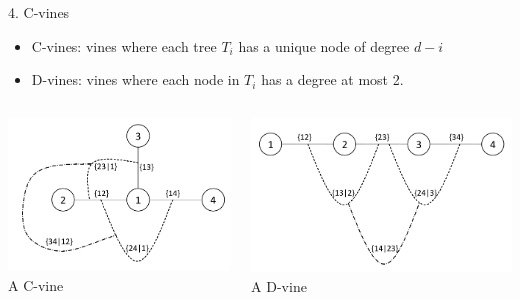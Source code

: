 \documentclass[
  ignorenonframetext,
]{beamer}
\providecommand{\tightlist}{%
  \setlength{\itemsep}{0pt}\setlength{\parskip}{0pt}}
\begin{document}
\begin{frame}{4. C-vines}
\protect\hypertarget{c-vines}{}
\begin{itemize}
\tightlist
\item
  \small C-vines: vines where each tree \(T_i\) has a unique node of
  degree \(d-i\)
\item
  \small D-vines: vines where each node in \(T_i\) has a degree at most
  2.
\end{itemize}

\begin{columns}[T]
  \begin{column}{0.5\textwidth}
    \centering
    \includegraphics[width=\textwidth]{c-vines.png}
    \tiny A C-vine
  \end{column}
  \begin{column}{0.5\textwidth}
    \centering
    \includegraphics[width=\textwidth]{d-vines.png}
    \tiny A D-vine
  \end{column}
\end{columns}
\end{frame}
\end{document}

